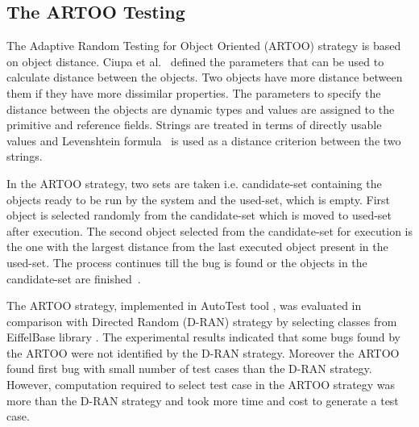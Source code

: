 \subsection{The ARTOO Testing}
The Adaptive Random Testing for Object Oriented (ARTOO) strategy is based on object distance. Ciupa et al.~\cite{Ciupa2006} defined the parameters that can be used to calculate distance between the objects. Two objects have more distance between them if they have more dissimilar properties. The parameters to specify the distance between the objects are dynamic types and values are assigned to the primitive and reference fields. Strings are treated in terms of directly usable values and Levenshtein formula~\cite{Levenshtein1966} is used as a distance criterion between the two strings.

In the ARTOO strategy, two sets are taken i.e. candidate-set containing the objects ready to be run by the system and the used-set, which is empty. First object is selected randomly from the candidate-set which is moved to used-set after execution. The second object selected from the candidate-set for execution is the one with the largest distance from the last executed object present in the used-set. The process continues till the bug is found or the objects in the candidate-set are finished~\cite{Ciupa2006}.

The ARTOO strategy, implemented in AutoTest tool \cite{Ciupa2008a}, was evaluated in comparison with Directed Random (D-RAN) strategy by selecting classes from EiffelBase library \cite{meyer1987eiffel}. The experimental results indicated that some bugs found by the ARTOO were not identified by the D-RAN strategy. Moreover the ARTOO found first bug with small number of test cases than the D-RAN strategy. However, computation required to select test case in the ARTOO strategy was more than the D-RAN strategy and took more time and cost to generate a test case.

